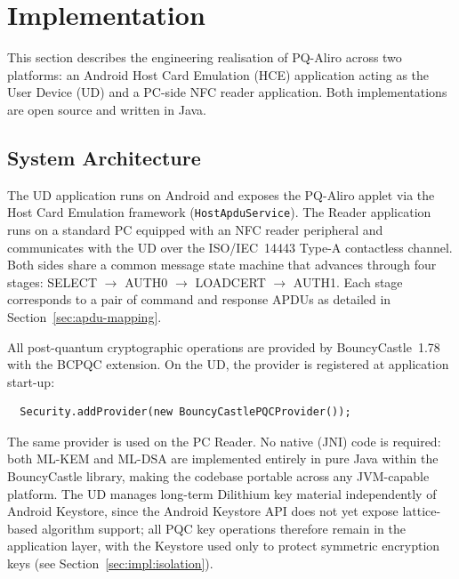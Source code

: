 \section{Implementation}
\label{sec:implementation}

This section describes the engineering realisation of PQ-Aliro across two
platforms: an Android Host Card Emulation (HCE) application acting as the User
Device (UD) and a PC-side NFC reader application.
Both implementations are open source and written in Java.

\subsection{System Architecture}
\label{sec:impl:arch}

The UD application runs on Android and exposes the PQ-Aliro applet via the
Host Card Emulation framework (\texttt{HostApduService}).
The Reader application runs on a standard PC equipped with an NFC reader
peripheral and communicates with the UD over the ISO/IEC~14443 Type-A
contactless channel.
Both sides share a common message state machine that advances through four
stages: SELECT $\to$ AUTH0 $\to$ LOADCERT $\to$ AUTH1\@.
Each stage corresponds to a pair of command and response APDUs as detailed in
Section~\ref{sec:apdu-mapping}.

All post-quantum cryptographic operations are provided by BouncyCastle~1.78
with the BCPQC extension.
On the UD, the provider is registered at application start-up:
\begin{verbatim}
  Security.addProvider(new BouncyCastlePQCProvider());
\end{verbatim}
The same provider is used on the PC Reader.
No native (JNI) code is required: both ML-KEM and ML-DSA are implemented
entirely in pure Java within the BouncyCastle library, making the codebase
portable across any JVM-capable platform.
The UD manages long-term Dilithium key material independently of Android
Keystore, since the Android Keystore API does not yet expose lattice-based
algorithm support; all PQC key operations therefore remain in the application
layer, with the Keystore used only to protect symmetric encryption keys (see
Section~\ref{sec:impl:isolation}).

